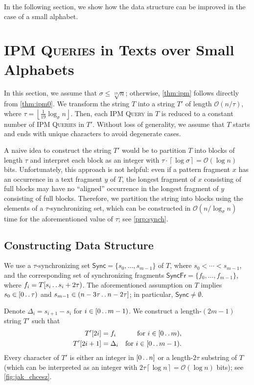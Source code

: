 \documentclass[a4paper]{article}
\theoremstyle{definition}
\theoremstyle{remark}
\newcommand{\IPM}{\textsc{IPM Queries}\xspace}
\newcommand{\IPMOne}{\textsc{IPM Query}\xspace}
\newcommand{\ceil}[1]{\left\lceil #1 \right\rceil}
\newcommand{\floor}[1]{\left\lfloor #1 \right\rfloor}
\newcommand{\dd}{\mathinner{\ldotp\ldotp}}
\newcommand{\Oh}{\mathcal{O}}
\renewcommand{\S}{\mathsf{Sync}}
\renewcommand{\S}{\mathsf{Sync}}
\newcommand{\SF}{\mathsf{SyncFr}}
\begin{document}
In the following section, we show how the data structure can be improved in the case of a small alphabet.

\section{\IPM in Texts over Small Alphabets}\label{sec:packed}
In this section, we assume that $\sigma \le \sqrt[19]{n}$; otherwise, \cref{thm:ipm} follows directly from \cref{thm:ipm0}.
We transform the string $T$ into a string $T'$ of length $\Oh(n/\tau)$, where $\tau = \floor{\frac1{19} \log_\sigma n}$.
Then, each \IPMOne in $T$ is reduced to a constant number of \IPM in $T'$.
Without loss of generality, we assume that $T$ starts and ends with unique characters to avoid degenerate cases.

A naive idea to construct the string $T'$ would be to partition $T$ into blocks of length $\tau$ and interpret each block as an integer with $\tau\cdot \ceil {\log \sigma}= \Oh(\log n)$ bits.
Unfortunately, this approach is not helpful: even if a pattern fragment $x$ has an occurrence in a text fragment $y$ of $T$,
the longest fragment of $x$ consisting of full blocks may have no ``aligned'' occurrence in the longest fragment of $y$ consisting of full blocks.
Therefore, we partition the string into blocks using the elements of a $\tau$-synchronizing set, which can be constructed in $\Oh(n / \log_\sigma n)$ time for the aforementioned value of $\tau$; see \cref{prp:synch}.

\subsection{Constructing Data Structure}
We use a $\tau$-synchronizing set 
$\S = \{s_0,\ldots, s_{m-1}\}$ of $T$, where $s_0 < \cdots < s_{m-1}$, and the corresponding set of synchronizing fragments $\SF=\{f_0,\ldots,f_{m-1}\}$, where
$f_i=T[s_i \dd s_i+2\tau)$. 
The aforementioned assumption on $T$ implies $s_0 \in [0\dd \tau)$ and $s_{m-1} \in (n-3\tau\dd n-2\tau]$; in particular, $\S \ne \emptyset$.

Denote $\Delta_i=s_{i+1}-s_i$ for $i\in [0\dd m-1)$.
We construct a length-$(2m-1)$ string $T'$ such that 
\[\begin{aligned}
T'[2i] &= f_i & \text{for }i\in [0\dd m),\\
T'[2i+1] &= \Delta_i & \text{for }i\in [0\dd m-1).
\end{aligned}
\]
Every character of $T'$ is either an integer in $[0\dd n]$ or a length-$2\tau$ substring of $T$ (which can be interpreted as an integer with $2\tau \ceil{\log n} = \Oh(\log n)$ bits); see \cref{fig:jak_chcesz}.
\end{document}
